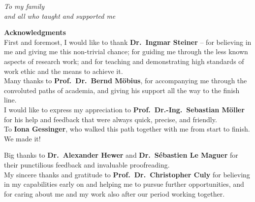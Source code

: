 
\mbox{} %
\newpage
\vspace*{4cm}
\begin{flushright}
        \textit{\large To my family\\and all who taught and supported me}
\end{flushright}
\newpage

\vspace*{0.4cm}
\begin{center}
    {\calligra \fontsize{40}{50}\selectfont \textbf{Acknowledgments}}\\[1.7cm]
    \Large
	First and foremost, I would like to thank \textbf{Dr.\ Ingmar Steiner} -- for believing in me and giving me this non-trivial chance; for guiding me through the less known aspects of research work; and for teaching and demonstrating high standards of work ethic and the means to achieve it.\\[0.8cm]
	
	Many thanks to \textbf{ Prof.\ Dr.\ Bernd Möbius}, for accompanying me through the convoluted paths of academia, and giving his support all the way to the finish line.\\[0.8cm]
	
	I would like to express my appreciation to \textbf{Prof.\ Dr.-Ing.\ Sebastian Möller} for his help and feedback that were always quick, precise, and friendly.\\[0.8cm]
	
	To \textbf{Iona Gessinger}, who walked this path together with me from start to finish.
	We made it!\\[2cm]
	
	\vspace*{2cm}
	
	Big thanks to \textbf{Dr.\ Alexander Hewer} and \textbf{Dr.\ Sébastien Le Maguer} for their punctilious feedback and invaluable proofreading.\\[0.8cm]
	
	My sincere thanks and gratitude to \textbf{Prof.\ Dr.\ Christopher Culy} for believing in my capabilities early on and helping me to pursue further opportunities, and for caring about me and my work also after our period working together.\\[0.8cm]
	

\end{center}
